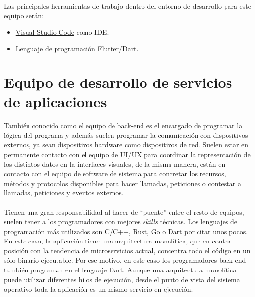 \paragraph{}Las principales herramientas de trabajo dentro del entorno de desarrollo
para este equipo serán:

\begin{itemize}
    \item \hyperref[sec:vscode]{Visual Studio Code} como \gls{IDE}.
    \item Lenguaje de programación Flutter/Dart.
\end{itemize}

\section{Equipo de desarrollo de servicios de aplicaciones}

\paragraph{}También conocido como el equipo de \gls{back-end} es el encargado de programar
la lógica del programa y además suelen programar la comunicación con dispositivos externos,
ya sean dispositivos hardware como dispositivos de red. Suelen estar en permanente
contacto con el \hyperref[sec:uiteam]{equipo de UI/UX} para coordinar la representación
de los distintos datos en la interfaces visuales, de la misma manera, están en contacto
con el \hyperref[sec:systemteam]{equipo de software de sistema} para concretar los
recursos, métodos y protocolos disponibles para hacer llamadas, peticiones o contestar
a llamadas, peticiones y eventos externos.

\paragraph{}Tienen una gran responsabilidad al hacer de ``puente'' entre el resto de
equipos, suelen tener a los programadores con mejores \emph{skills} técnicas. Los
lenguajes de programación más utilizados son C/C++, Rust, Go o Dart por citar unos pocos.
En este caso, la aplicación tiene una arquitectura monolítica, que en contra posición
con la tendencia de microservicios actual, concentra todo el código en un sólo binario
ejecutable. Por ese motivo, en este caso los programadores \gls{back-end} también
programan en el lenguaje Dart. Aunque una arquitectura monolítica puede utilizar diferentes
hilos de ejecución, desde el punto de vista del sistema operativo toda la aplicación es un
mismo servicio en ejecución.

